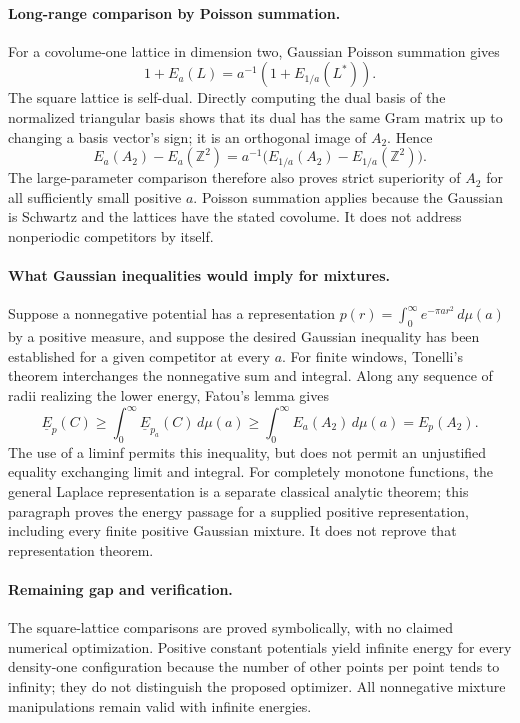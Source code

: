 \documentclass[11pt]{article}
\begin{document}
\paragraph{Long-range comparison by Poisson summation.}
For a covolume-one lattice in dimension two, Gaussian Poisson summation gives
\[
1+E_a(L)=a^{-1}(1+E_{1/a}(L^*)).
\]
The square lattice is self-dual. Directly computing the dual basis of the normalized triangular basis shows that its dual has the same Gram matrix up to changing a basis vector's sign; it is an orthogonal image of $A_2$. Hence
\[
E_a(A_2)-E_a(\mathbb Z^2)
=a^{-1}\bigl(E_{1/a}(A_2)-E_{1/a}(\mathbb Z^2)\bigr).
\]
The large-parameter comparison therefore also proves strict superiority of $A_2$ for all sufficiently small positive $a$. Poisson summation applies because the Gaussian is Schwartz and the lattices have the stated covolume. It does not address nonperiodic competitors by itself.

\paragraph{What Gaussian inequalities would imply for mixtures.}
Suppose a nonnegative potential has a representation $p(r)=\int_0^\infty e^{-\pi ar^2}\,d\mu(a)$ by a positive measure, and suppose the desired Gaussian inequality has been established for a given competitor at every $a$. For finite windows, Tonelli's theorem interchanges the nonnegative sum and integral. Along any sequence of radii realizing the lower energy, Fatou's lemma gives
\[
\underline E_p(C)\ge\int_0^\infty\underline E_{p_a}(C)\,d\mu(a)
\ge\int_0^\infty E_a(A_2)\,d\mu(a)=E_p(A_2).
\]
The use of a liminf permits this inequality, but does not permit an unjustified equality exchanging limit and integral. For completely monotone functions, the general Laplace representation is a separate classical analytic theorem; this paragraph proves the energy passage for a supplied positive representation, including every finite positive Gaussian mixture. It does not reprove that representation theorem.

\paragraph{Remaining gap and verification.}
The square-lattice comparisons are proved symbolically, with no claimed numerical optimization. Positive constant potentials yield infinite energy for every density-one configuration because the number of other points per point tends to infinity; they do not distinguish the proposed optimizer. All nonnegative mixture manipulations remain valid with infinite energies.
\end{document}
